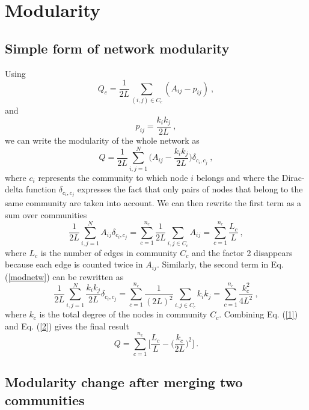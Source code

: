 \documentclass[11 pt , letterpaper , twoside , openright]{book}
\begin{document}
\section{Modularity}\label{modul}
\subsection{Simple form of network modularity}\label{simplemod}

Using \cite{Albert2016}
\begin{equation}
	Q_c = \frac{1}{2L}\sum_{(i,j) \in C_c} (A_{ij} - p_{ij}) \ ,
\end{equation}
and \cite{Albert2016}
\begin{equation}
	p_{ij} = \frac{k_ik_j}{2L} \ ,
\end{equation}
we can write the modularity of the whole network as \cite{Albert2016}
\begin{equation}\label{modnetw}
	Q = \frac{1}{2L}\sum_{i, j = 1}^N \bigg(A_{ij} - \frac{k_ik_j}{2L}\bigg) \delta_{c_i, c_j} \ ,
\end{equation}
where $c_i$ represents the community to which node $i$ belongs and where the Dirac-delta function $\delta_{c_i, c_j}$ expresses the fact that only pairs of nodes that belong to the same community are taken into account. We can then rewrite the first term as a sum over communities \cite{Albert2016}
\begin{equation}\label{1}
	\frac{1}{2L}\sum_{i, j = 1}^N A_{ij}\delta_{c_i, c_j} = \sum_{c=1}^{n_c}\frac{1}{2L}\sum_{i, j \in C_c} A_{ij} = \sum_{c=1}^{n_c}\frac{L_c}{L} \ ,
\end{equation}
where $L_c$ is the number of edges in community $C_c$ and the factor 2 disappears because each edge is counted twice in $A_{ij}$. Similarly, the second term in Eq. (\ref{modnetw}) can be rewritten as \cite{Albert2016}
\begin{equation}\label{2}
	\frac{1}{2L}\sum_{i, j = 1}^N \frac{k_ik_j}{2L} \delta_{c_i, c_j} = \sum_{c=1}^{n_c}\frac{1}{(2L)^2}\sum_{i, j \in C_c} k_ik_j = \sum_{c=1}^{n_c}\frac{k_c^2}{4L^2} \ ,
\end{equation}
where $k_c$ is the total degree of the nodes in community $C_c$. Combining Eq. (\ref{1}) and Eq. (\ref{2}) gives the final result \cite{Albert2016}
\begin{equation}\label{Qfin}
	Q = \sum_{c = 1}^{n_c}\bigg[\frac{L_c}{L} - \bigg(\frac{k_c}{2L}\bigg)^2 \bigg] \ .
\end{equation}

\subsection{Modularity change after merging two communities}\label{modchange}
\end{document}

